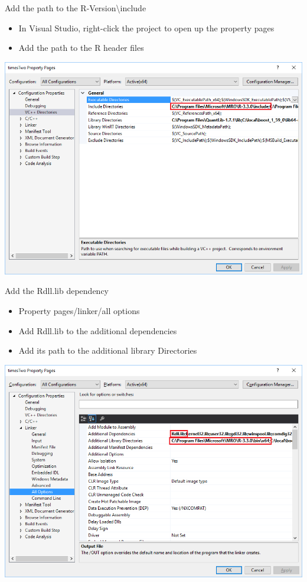 \documentclass[ignorenonframetext,]{beamer}
\providecommand{\tightlist}{%
\setlength{\itemsep}{0pt}\setlength{\parskip}{0pt}}
\begin{document}
\begin{frame}{Add the path to the R-Version\textbackslash{}include}

\begin{itemize}
\tightlist
\item
  In Visual Studio, right-click the project to open up the property
  pages
\item
  Add the path to the R header files
\end{itemize}

\centerline{
  \includegraphics[width=\textwidth,height=0.7\textheight,keepaspectratio]{./inclDir.png}
}

\end{frame}

\begin{frame}{Add the Rdll.lib dependency}

\begin{itemize}
\tightlist
\item
  Property pages/linker/all options
\item
  Add Rdll.lib to the additional dependencies
\item
  Add its path to the additional library Directories
\end{itemize}

\centerline{
  \includegraphics[width=\textwidth,height=0.7\textheight,keepaspectratio]{./linkerOptions.png}
}

\end{frame}
\end{document}

